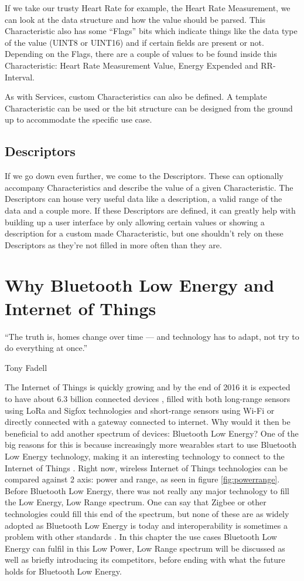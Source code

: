 \documentclass[pdftex,a4paper,12pt,twoside]{report}
\begin{document}
If we take our trusty Heart Rate for example, the Heart Rate Measurement, we can look at the data structure and how the value should be parsed. This Characteristic also has some ``Flags'' bits which indicate things like the data type of the value (UINT8 or UINT16) and if certain fields are present or not. Depending on the Flags, there are a couple of values to be found inside this Characteristic: Heart Rate Measurement Value, Energy Expended and RR-Interval.

As with Services, custom Characteristics can also be defined. A template Characteristic can be used or the bit structure can be designed from the ground up to accommodate the specific use case.

\section{Descriptors}
\label{sec:descriptors}
If we go down even further, we come to the Descriptors. These can optionally accompany Characteristics and describe the value of a given Characteristic. The Descriptors can house very useful data like a description, a valid range of the data and a couple more. If these Descriptors are defined, it can greatly help with building up a user interface by only allowing certain values or showing a description for a custom made Characteristic, but one shouldn't rely on these Descriptors as they're not filled in more often than they are.

\chapter{Why Bluetooth Low Energy and Internet of Things}
\label{ch:BLEIOT}
\epigraph{``The truth is, homes change over time — and technology has to adapt, not try to do everything at once.''}{Tony Fadell}
The Internet of Things is quickly growing and by the end of 2016 it is expected to have about 6.3 billion connected devices \citep{gartner2015}, filled with both long-range sensors using LoRa and Sigfox technologies and short-range sensors using Wi-Fi or directly connected with a gateway connected to internet. Why would it then be beneficial to add another spectrum of devices: Bluetooth Low Energy? One of the big reasons for this is because increasingly more wearables start to use Bluetooth Low Energy technology, making it an interesting technology to connect to the Internet of Things \citep{wei2014wearables}. Right now, wireless Internet of Things technologies can be compared against 2 axis: power and range, as seen in figure \ref{fig:powerrange}. Before Bluetooth Low Energy, there was not really any major technology to fill the Low Energy, Low Range spectrum. One can say that Zigbee or other technologies could fill this end of the spectrum, but none of these are as widely adopted as Bluetooth Low Energy is today and interoperability is sometimes a problem with other standards \citep{colitti2014}. In this chapter the use cases Bluetooth Low Energy can fulfil in this Low Power, Low Range spectrum will be discussed as well as briefly introducing its competitors, before ending with what the future holds for Bluetooth Low Energy.
\end{document}
